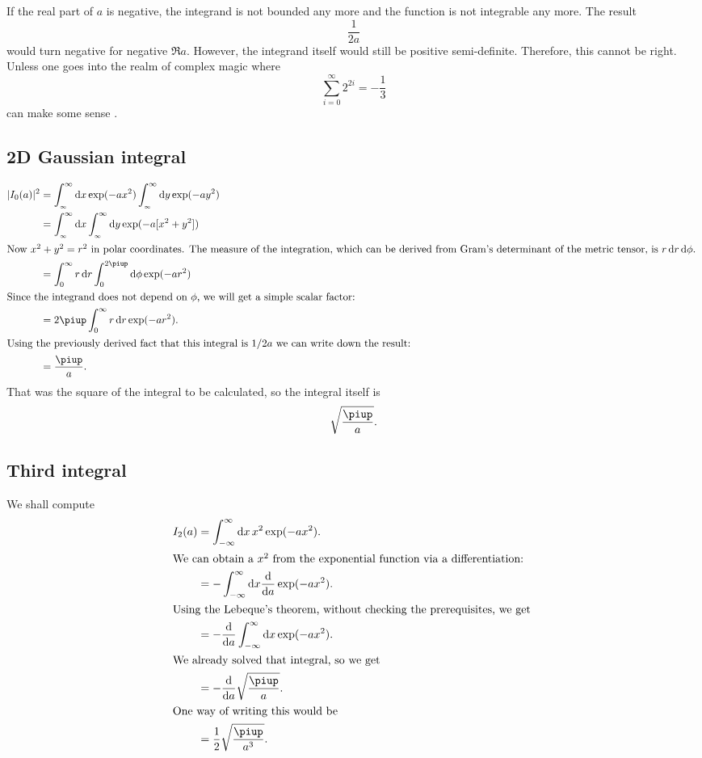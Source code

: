 \documentclass[11pt, english, fleqn, DIV=15, headinclude, BCOR=1cm]{scrartcl}
\begin{document}
If the real part of $a$ is negative, the integrand is not bounded any more and
the function is not integrable any more. The result
\[
    \frac{1}{2a}
\]
would turn negative for negative $\Re a$. However, the integrand itself would
still be positive semi-definite. Therefore, this cannot be right. Unless one
goes into the realm of complex magic where
\[
    \sum_{i = 0}^\infty 2^{2i} = - \frac{1}{3}
\]
can make some sense \parencite[78]{penrose-road_to_reality}.

\subsection{2D Gaussian integral}

\begin{align*}
    |I_0(a)|^2
    &=
    \int_{_\infty}^\infty \dif x \exp(-ax^2)
    \int_{_\infty}^\infty \dif y \exp(-ay^2) \\
    &=
    \int_{_\infty}^\infty \dif x \int_{_\infty}^\infty \dif y \exp(-a[x^2+y^2]) \\
    \intertext{%
        Now $x^2 + y^2 = r^2$ in polar coordinates. The measure of the
        integration, which can be derived from Gram's determinant of the
        metric tensor, is $r \dif r \dif \phi$.
    }
    &= \int_0^\infty r \dif r \int_0^{2\piup} \dif \phi \exp(-ar^2) \\
    \intertext{%
        Since the integrand does not depend on $\phi$, we will get a simple
        scalar factor:
    }
    &= 2 \piup \int_0^\infty r \dif r \exp(-ar^2). \\
    \intertext{%
        Using the previously derived fact that this integral is $1/2a$ we can
        write down the result:
    }
    &= \frac{\piup}a.
\end{align*}
That was the square of the integral to be calculated, so the integral itself is
\[
    \sqrt{\frac\piup a}.
\]

\subsection{Third integral}

We shall compute
\begin{align*}
    I_2(a)
    &= \int_{-\infty}^\infty \dif x \, x^2 \exp(-ax^2). \\
    \intertext{%
        We can obtain a $x^2$ from the exponential function via a
        differentiation:
    }
    &= - \int_{-\infty}^\infty \dif x \od{}a \exp(-ax^2). \\
    \intertext{%
        Using the Lebeque's theorem, without checking the prerequisites, we get
    }
    &= - \od{}a \int_{-\infty}^\infty \dif x \exp(-ax^2). \\
    \intertext{%
        We already solved that integral, so we get
    }
    &= - \od{}a \sqrt{\frac{\piup}{a}}. \\
    \intertext{%
        One way of writing this would be
    }
    &= \frac 12 \sqrt{\frac{\piup}{a^3}}.
\end{align*}
\end{document}
